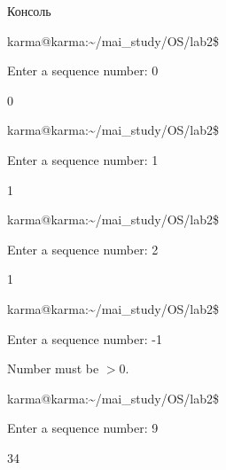\documentclass[a4paper,portrait,12pt]{article}
\begin{document}





\begin{flushleft}
Консоль
\end{flushleft}





\begin{flushleft}
karma@karma:\~{}/mai\_study/OS/lab2\$
\end{flushleft}


\begin{flushleft}
Enter a sequence number: 0
\end{flushleft}


0


\begin{flushleft}
karma@karma:\~{}/mai\_study/OS/lab2\$
\end{flushleft}


\begin{flushleft}
Enter a sequence number: 1
\end{flushleft}


1


\begin{flushleft}
karma@karma:\~{}/mai\_study/OS/lab2\$
\end{flushleft}


\begin{flushleft}
Enter a sequence number: 2
\end{flushleft}


1


\begin{flushleft}
karma@karma:\~{}/mai\_study/OS/lab2\$
\end{flushleft}


\begin{flushleft}
Enter a sequence number: -1
\end{flushleft}


\begin{flushleft}
Number must be $>$0.
\end{flushleft}


\begin{flushleft}
karma@karma:\~{}/mai\_study/OS/lab2\$
\end{flushleft}


\begin{flushleft}
Enter a sequence number: 9
\end{flushleft}


34
\end{document}
